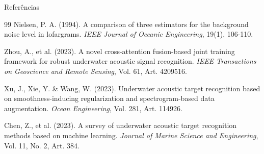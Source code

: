 \documentclass{beamer}
\begin{document}
\begin{frame}[allowframebreaks]{Referências}
\begin{thebibliography}{99}
        Nielsen, P. A. (1994). A comparison of three estimators for the background noise level in lofargrams. \textit{IEEE Journal of Oceanic Engineering}, 19(1), 106-110.

        Zhou, A., et al. (2023). A novel cross-attention fusion-based joint training framework for robust underwater acoustic signal recognition. \textit{IEEE Transactions on Geoscience and Remote Sensing}, Vol. 61, Art. 4209516.

        Xu, J., Xie, Y. \& Wang, W. (2023). Underwater acoustic target recognition based on smoothness-inducing regularization and spectrogram-based data augmentation. \textit{Ocean Engineering}, Vol. 281, Art. 114926.

        Chen, Z., et al. (2023). A survey of underwater acoustic target recognition methods based on machine learning. \textit{Journal of Marine Science and Engineering}, Vol. 11, No. 2, Art. 384.
    \end{thebibliography}
\end{frame}
\end{document}
